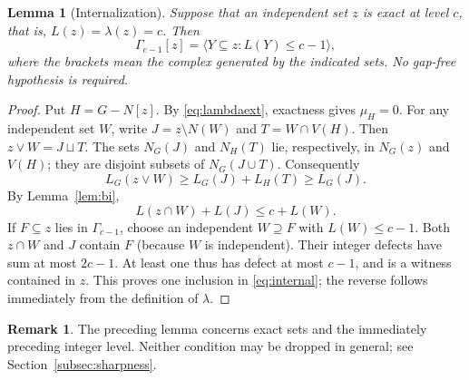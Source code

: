 \documentclass[11pt,a4paper]{article}
\newtheorem{lemma}[theorem]{Lemma}
\theoremstyle{definition}
\newtheorem{remark}[theorem]{Remark}
\newcommand{\G}{\Gamma}
\begin{document}
\begin{lemma}[Internalization]\label{lem:internal}
Suppose that an independent set $z$ is exact at level $c$, that is, $L(z)=\lambda(z)=c$. Then
\begin{equation}\label{eq:internal}
 \G_{c-1}[z]=\langle Y\subseteq z:L(Y)\leq c-1\rangle,
\end{equation}
where the brackets mean the complex generated by the indicated sets. No gap-free hypothesis is required.
\end{lemma}
\begin{proof}
Put $H=G-N[z]$. By \eqref{eq:lambdaext}, exactness gives $\mu_H=0$. For any independent set $W$, write $J=z\setminus N(W)$ and $T=W\cap V(H)$. Then $z\vee W=J\sqcup T$. The sets $N_G(J)$ and $N_H(T)$ lie, respectively, in $N_G(z)$ and $V(H)$; they are disjoint subsets of $N_G(J\cup T)$. Consequently
\[
 L_G(z\vee W)\geq L_G(J)+L_H(T)\geq L_G(J).
\]
By Lemma~\ref{lem:bi},
\begin{equation}\label{eq:two}
 L(z\cap W)+L(J)\leq c+L(W).
\end{equation}
If $F\subseteq z$ lies in $\G_{c-1}$, choose an independent $W\supseteq F$ with $L(W)\leq c-1$. Both $z\cap W$ and $J$ contain $F$ (because $W$ is independent). Their integer defects have sum at most $2c-1$. At least one thus has defect at most $c-1$, and is a witness contained in $z$. This proves one inclusion in \eqref{eq:internal}; the reverse follows immediately from the definition of $\lambda$.
\end{proof}
\begin{remark}\label{rem:limits}
The preceding lemma concerns exact sets and the immediately preceding integer level. Neither condition may be dropped in general; see Section~\ref{subsec:sharpness}.
\end{remark}
\end{document}
